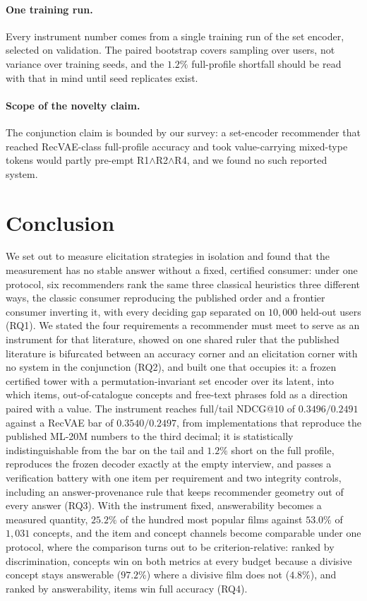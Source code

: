 \documentclass[manuscript,screen]{acmart}
\begin{document}
\paragraph{One training run.} Every instrument number comes from a single training run of the set encoder, selected on validation. The paired bootstrap covers sampling over users, not variance over training seeds, and the $1.2\%$ full-profile shortfall should be read with that in mind until seed replicates exist.

\paragraph{Scope of the novelty claim.} The conjunction claim is bounded by our survey: a set-encoder recommender that reached RecVAE-class full-profile accuracy and took value-carrying mixed-type tokens would partly pre-empt R1$\wedge$R2$\wedge$R4, and we found no such reported system.

\section{Conclusion}\label{sec:conclusion}

We set out to measure elicitation strategies in isolation and found that the measurement has no stable answer without a fixed, certified consumer: under one protocol, six recommenders rank the same three classical heuristics three different ways, the classic consumer reproducing the published order and a frontier consumer inverting it, with every deciding gap separated on $10{,}000$ held-out users (RQ1). We stated the four requirements a recommender must meet to serve as an instrument for that literature, showed on one shared ruler that the published literature is bifurcated between an accuracy corner and an elicitation corner with no system in the conjunction (RQ2), and built one that occupies it: a frozen certified tower with a permutation-invariant set encoder over its latent, into which items, out-of-catalogue concepts and free-text phrases fold as a direction paired with a value. The instrument reaches full/tail NDCG@10 of $0.3496/0.2491$ against a RecVAE bar of $0.3540/0.2497$, from implementations that reproduce the published ML-20M numbers to the third decimal; it is statistically indistinguishable from the bar on the tail and $1.2\%$ short on the full profile, reproduces the frozen decoder exactly at the empty interview, and passes a verification battery with one item per requirement and two integrity controls, including an answer-provenance rule that keeps recommender geometry out of every answer (RQ3). With the instrument fixed, answerability becomes a measured quantity, $25.2\%$ of the hundred most popular films against $53.0\%$ of $1{,}031$ concepts, and the item and concept channels become comparable under one protocol, where the comparison turns out to be criterion-relative: ranked by discrimination, concepts win on both metrics at every budget because a divisive concept stays answerable ($97.2\%$) where a divisive film does not ($4.8\%$), and ranked by answerability, items win full accuracy (RQ4).
\end{document}
